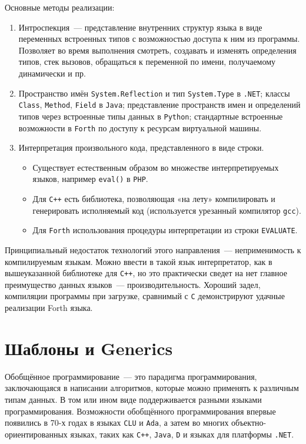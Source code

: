 \documentclass[a4paper,10pt]{article}
\begin{document}
Основные методы реализации:
\begin{enumerate}
   \item  Интроспекция~--- представление внутренних структур языка в виде переменных встроенных типов с возможностью доступа к ним из
      программы.  Позволяет во время выполнения смотреть, создавать и изменять определения типов, стек вызовов, обращаться к переменной по
      имени, получаемому динамически и пр.
        
   \item Пространство имён {\tt System.Reflection} и тип {\tt System.Type} в {\tt .NET}; классы {\tt Class}, {\tt Method}, {\tt Field} в
      {\tt Java}; представление пространств имен и определений типов через встроенные типы данных в {\tt Python}; стандартные встроенные
      возможности в {\tt Forth} по доступу к ресурсам виртуальной машины.

   \item Интерпретация произвольного кода, представленного в виде строки.
      \begin{itemize}
         \item Существует естественным образом во множестве интерпретируемых языков, например {\tt eval()} в {\tt PHP}.
         \item  Для {\tt C++} есть библиотека, позволяющая «на лету» компилировать и генерировать исполняемый код (используется
            урезанный компилятор {\tt gcc}).
         \item Для {\tt Forth} использования процедуры интерпретации из строки {\tt EVALUATE}.
      \end{itemize}
\end{enumerate}
   
Принципиальный недостаток технологий этого направления~--- неприменимость к компилируемым языкам. Можно ввести в такой язык интерпретатор,
как в вышеуказанной библиотеке для {\tt С++}, но это практически сведет на нет главное преимущество данных языков~--- производительность. Хороший
задел, компиляции программы при загрузке, сравнимый с {\tt С} демонстрируют удачные реализации Forth языка. 

\section{Шаблоны и Generics}
Обобщённое программирование~--- это парадигма программирования, заключающаяся в написании алгоритмов, которые можно применять к различным
типам данных. В том или ином виде поддерживается разными языками программирования. Возможности обобщённого программирования впервые
появились в 70-х годах в языках {\tt CLU} и {\tt Ada}, а затем во многих объектно-ориентированных языках, таких как {\tt C++}, {\tt Java},
{\tt D} и языках для платформы {\tt .NET}.
\end{document}
